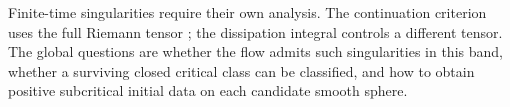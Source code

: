 \documentclass[11pt]{article}
\numberwithin{equation}{section}
\begin{document}
Finite-time singularities require their own analysis. The continuation
criterion uses the full Riemann tensor \cite[Theorem~1.2]{Lopez2018AmbientObstruction};
the dissipation integral controls a different tensor.
The global questions are whether the flow admits such singularities
in this band, whether a surviving closed critical class can be
classified, and how to obtain positive subcritical initial data on
each candidate smooth sphere.



\end{document}
